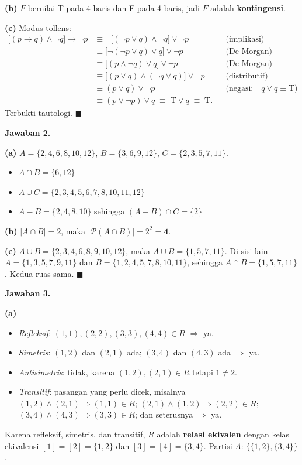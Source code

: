 \documentclass[11pt,a4paper]{article}
\newcommand{\jawab}[1]{\vspace{4pt}\noindent\textbf{Jawaban #1.}\par\nobreak\vspace{2pt}}
\newcommand{\Comp}[1]{\overline{#1}}
\begin{document}
\textbf{(b)} $F$ bernilai T pada 4 baris dan F pada 4 baris, jadi $F$ adalah
\textbf{kontingensi}.

\textbf{(c)} Modus tollens:
\begin{align*}
\big[(p \rightarrow q) \wedge \neg q\big] \rightarrow \neg p
&\equiv \neg\big[(\neg p \vee q) \wedge \neg q\big] \vee \neg p && \text{(implikasi)}\\
&\equiv \big[\neg(\neg p \vee q) \vee q\big] \vee \neg p && \text{(De Morgan)}\\
&\equiv \big[(p \wedge \neg q) \vee q\big] \vee \neg p && \text{(De Morgan)}\\
&\equiv \big[(p \vee q) \wedge (\neg q \vee q)\big] \vee \neg p && \text{(distributif)}\\
&\equiv (p \vee q) \vee \neg p && \text{(negasi: } \neg q \vee q \equiv \mathrm{T})\\
&\equiv (p \vee \neg p) \vee q \;\equiv\; \mathrm{T} \vee q \;\equiv\; \mathrm{T}.
\end{align*}
Terbukti tautologi. $\blacksquare$

\jawab{2}
\textbf{(a)} $A = \{2,4,6,8,10,12\}$, $B = \{3,6,9,12\}$, $C = \{2,3,5,7,11\}$.
\begin{itemize}[leftmargin=*,nosep]
  \item $A \cap B = \{6,12\}$
  \item $A \cup C = \{2,3,4,5,6,7,8,10,11,12\}$
  \item $A - B = \{2,4,8,10\}$ sehingga $(A-B) \cap C = \{2\}$
\end{itemize}

\textbf{(b)} $|A \cap B| = 2$, maka $|\mathcal{P}(A \cap B)| = 2^{2} = \mathbf{4}$.

\textbf{(c)} $A \cup B = \{2,3,4,6,8,9,10,12\}$, maka $\Comp{A \cup B} = \{1,5,7,11\}$.
Di sisi lain $\Comp{A} = \{1,3,5,7,9,11\}$ dan $\Comp{B} = \{1,2,4,5,7,8,10,11\}$,
sehingga $\Comp{A} \cap \Comp{B} = \{1,5,7,11\}$. Kedua ruas sama. $\blacksquare$

\jawab{3}
\textbf{(a)}
\begin{itemize}[leftmargin=*,nosep]
  \item \emph{Refleksif}: $(1,1),(2,2),(3,3),(4,4) \in R$ $\Rightarrow$ ya.
  \item \emph{Simetris}: $(1,2)$ dan $(2,1)$ ada; $(3,4)$ dan $(4,3)$ ada $\Rightarrow$ ya.
  \item \emph{Antisimetris}: tidak, karena $(1,2),(2,1) \in R$ tetapi $1 \ne 2$.
  \item \emph{Transitif}: pasangan yang perlu dicek, misalnya
        $(1,2)\wedge(2,1) \Rightarrow (1,1) \in R$;
        $(2,1)\wedge(1,2) \Rightarrow (2,2) \in R$;
        $(3,4)\wedge(4,3) \Rightarrow (3,3) \in R$; dan seterusnya $\Rightarrow$ ya.
\end{itemize}
Karena refleksif, simetris, dan transitif, $R$ adalah \textbf{relasi ekivalen}
dengan kelas ekivalensi $[1] = [2] = \{1,2\}$ dan $[3] = [4] = \{3,4\}$.
Partisi $A$: $\{\{1,2\},\{3,4\}\}$.
\end{document}

